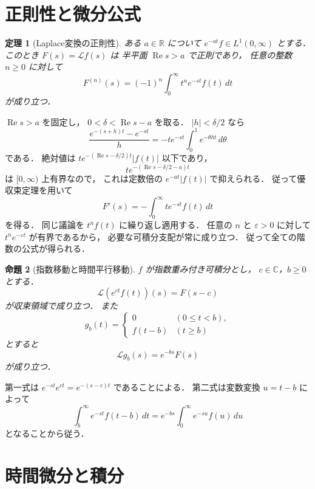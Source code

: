 \documentclass[a5paper,10pt,onecolumn]{jsarticle}
\makeatletter
\theoremstyle{mathnotetheorem}
\newtheorem{theorem}{定理}[section]
\newtheorem{proposition}[theorem]{命題}
\renewcommand{\proofname}{証明}
\renewenvironment{proof}[1][\proofname]{%
  \par\pushQED{\qed}\normalfont\topsep4\p@\@plus2\p@\relax
  \trivlist\item[\hskip\labelsep\bfseries #1]\ignorespaces
}{\popQED\endtrivlist\@endpefalse}
\makeatother
\begin{document}
\section{正則性と微分公式}

\begin{theorem}[Laplace変換の正則性]\label{thm:holomorphic}
ある $a\in\mathbb R$ について
$e^{-at}f\in L^1(0,\infty)$ とする．
このとき $F(s)=\mathcal Lf(s)$ は
半平面 $\operatorname{Re}s>a$ で正則であり，
任意の整数 $n\ge0$ に対して
\[
 F^{(n)}(s)
 =(-1)^n\int_0^\infty t^n e^{-st}f(t)\,dt
\]
が成り立つ．
\end{theorem}
\begin{proof}
$\operatorname{Re}s>a$ を固定し，
$0<\delta<\operatorname{Re}s-a$ を取る．
$|h|<\delta/2$ なら
\[
 \frac{e^{-(s+h)t}-e^{-st}}h
 =-t e^{-st}\int_0^1e^{-\theta ht}\,d\theta
\]
である．
絶対値は
$t e^{-(\operatorname{Re}s-\delta/2)t}|f(t)|$
以下であり，
\[
 t e^{-(\operatorname{Re}s-\delta/2-a)t}
\]
は $[0,\infty)$ 上有界なので，
これは定数倍の $e^{-at}|f(t)|$ で抑えられる．
従って優収束定理を用いて
\[
 F'(s)=-\int_0^\infty t e^{-st}f(t)\,dt
\]
を得る．
同じ議論を $t^nf(t)$ に繰り返し適用する．
任意の $n$ と $\varepsilon>0$ に対して
$t^n e^{-\varepsilon t}$ が有界であるから，
必要な可積分支配が常に成り立つ．
従って全ての階数の公式が得られる．
\end{proof}

\begin{proposition}[指数移動と時間平行移動]\label{prop:shifts}
$f$ が指数重み付き可積分とし，
$c\in\mathbb C$，$b\ge0$ とする．
\[
 \mathcal L(e^{ct}f(t))(s)=F(s-c)
\]
が収束領域で成り立つ．
また
\[
 g_b(t)=
 \begin{cases}
 0&(0\le t<b),\\
 f(t-b)&(t\ge b)
 \end{cases}
\]
とすると
\[
 \mathcal Lg_b(s)=e^{-bs}F(s)
\]
が成り立つ．
\end{proposition}
\begin{proof}
第一式は
$e^{-st}e^{ct}=e^{-(s-c)t}$ であることによる．
第二式は変数変換 $u=t-b$ によって
\[
 \int_b^\infty e^{-st}f(t-b)\,dt
 =e^{-bs}\int_0^\infty e^{-su}f(u)\,du
\]
となることから従う．
\end{proof}

\section{時間微分と積分}
\end{document}
